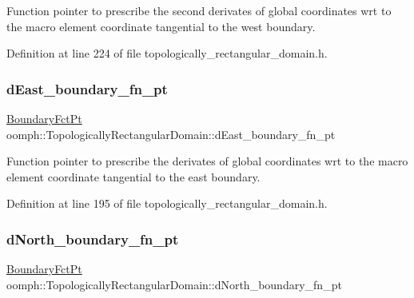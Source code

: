 Function pointer to prescribe the second derivates of global coordinates wrt to the macro element coordinate tangential to the west boundary. 



Definition at line 224 of file topologically\+\_\+rectangular\+\_\+domain.\+h.

\mbox{\label{classoomph_1_1TopologicallyRectangularDomain_a535ff2d7f9561425d9fd4b0d57bbc769}} 
\subsubsection{\texorpdfstring{d\+East\+\_\+boundary\+\_\+fn\+\_\+pt}{dEast\_boundary\_fn\_pt}}
{\footnotesize\ttfamily \hyperlink{classoomph_1_1TopologicallyRectangularDomain_a8b2e24f5500d86c93aef509c5410e7cc}{Boundary\+Fct\+Pt} oomph\+::\+Topologically\+Rectangular\+Domain\+::d\+East\+\_\+boundary\+\_\+fn\+\_\+pt\hspace{0.3cm}{\ttfamily [private]}}



Function pointer to prescribe the derivates of global coordinates wrt to the macro element coordinate tangential to the east boundary. 



Definition at line 195 of file topologically\+\_\+rectangular\+\_\+domain.\+h.

\mbox{\label{classoomph_1_1TopologicallyRectangularDomain_afda00e0273ae8dacbd3626bfd363fcc3}} 
\subsubsection{\texorpdfstring{d\+North\+\_\+boundary\+\_\+fn\+\_\+pt}{dNorth\_boundary\_fn\_pt}}
{\footnotesize\ttfamily \hyperlink{classoomph_1_1TopologicallyRectangularDomain_a8b2e24f5500d86c93aef509c5410e7cc}{Boundary\+Fct\+Pt} oomph\+::\+Topologically\+Rectangular\+Domain\+::d\+North\+\_\+boundary\+\_\+fn\+\_\+pt\hspace{0.3cm}{\ttfamily [private]}}



